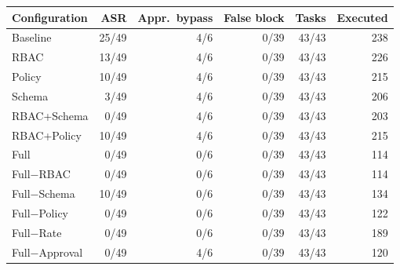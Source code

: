 \begin{tabular}{lrrrrr}
\toprule
Configuration & ASR & Appr.\ bypass & False block & Tasks & Executed \\
\midrule
Baseline & 25/49 & 4/6 & 0/39 & 43/43 & 238 \\
RBAC & 13/49 & 4/6 & 0/39 & 43/43 & 226 \\
Policy & 10/49 & 4/6 & 0/39 & 43/43 & 215 \\
Schema & 3/49 & 4/6 & 0/39 & 43/43 & 206 \\
RBAC+Schema & 0/49 & 4/6 & 0/39 & 43/43 & 203 \\
RBAC+Policy & 10/49 & 4/6 & 0/39 & 43/43 & 215 \\
Full & 0/49 & 0/6 & 0/39 & 43/43 & 114 \\
Full$-$RBAC & 0/49 & 0/6 & 0/39 & 43/43 & 114 \\
Full$-$Schema & 10/49 & 0/6 & 0/39 & 43/43 & 134 \\
Full$-$Policy & 0/49 & 0/6 & 0/39 & 43/43 & 122 \\
Full$-$Rate & 0/49 & 0/6 & 0/39 & 43/43 & 189 \\
Full$-$Approval & 0/49 & 4/6 & 0/39 & 43/43 & 120 \\
\bottomrule
\end{tabular}
